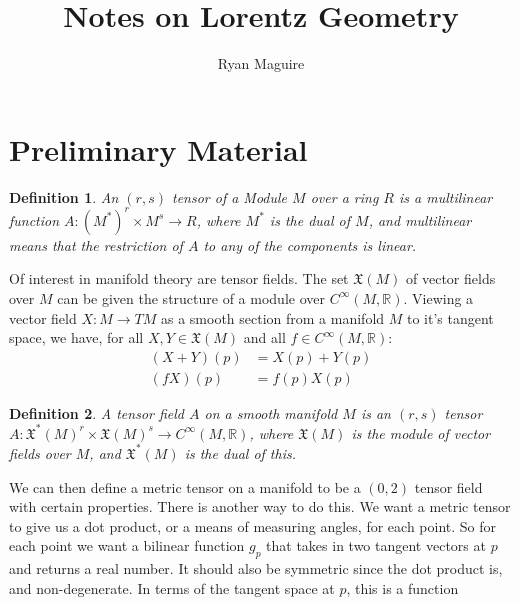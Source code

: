 \documentclass{article}
\author{Ryan Maguire}
\title{Notes on Lorentz Geometry}
\theoremstyle{plain}
\theoremstyle{thmit}
\theoremstyle{normal}
\newtheorem{definition}{Definition}[section]
\begin{document}
    \maketitle
    \tableofcontents
    \listoffigures
    \section{Preliminary Material}
        \begin{definition}
            An $(r,s)$ tensor of a Module $M$ over a ring $R$ is a
            multilinear function $A:(M^{*})^{r}\times{M}^{s}\rightarrow{R}$,
            where $M^{*}$ is the dual of $M$, and multilinear means that the
            restriction of $A$ to any of the components is linear.
        \end{definition}
        Of interest in manifold theory are tensor fields. The set
        $\mathfrak{X}(M)$ of vector fields over $M$ can be given the structure
        of a module over $C^{\infty}(M,\mathbb{R})$. Viewing a vector field
        $X:M\rightarrow{TM}$ as a smooth section from a manifold $M$ to it's
        tangent space, we have, for all $X,Y\in\mathfrak{X}(M)$ and all
        $f\in{C}^{\infty}(M,\mathbb{R})$:
        \begin{subequations}
            \begin{align}
                (X+Y)(p)&=X(p)+Y(p)\\
                (fX)(p)&=f(p)X(p)
            \end{align}
        \end{subequations}
        \begin{definition}
            A tensor field $A$ on a smooth manifold $M$ is an $(r,s)$ tensor
            $A:\mathfrak{X}^{*}(M)^{r}\times\mathfrak{X}(M)^{s}\rightarrow{C}^{\infty}(M,\mathbb{R})$,
            where $\mathfrak{X}(M)$ is the module of vector fields over $M$,
            and $\mathfrak{X}^{*}(M)$ is the dual of this.
        \end{definition}
        We can then define a metric tensor on a manifold to be a $(0,2)$ tensor
        field with certain properties. There is another way to do this. We want
        a metric tensor to give us a dot product, or a means of measuring
        angles, for each point. So for each point we want a bilinear function
        $g_{p}$ that takes in two tangent vectors at $p$ and returns a real
        number. It should also be symmetric since the dot product is, and
        non-degenerate. In terms of the tangent space at $p$, this is a function
\end{document}
